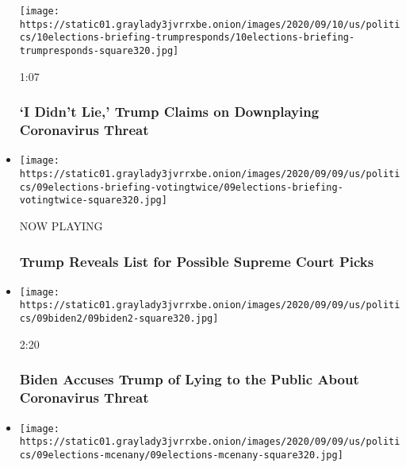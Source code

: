 \begin{itemize}
  \texttt{[image: https://static01.graylady3jvrrxbe.onion/images/2020/09/10/us/politics/10elections-briefing-trumpresponds/10elections-briefing-trumpresponds-square320.jpg]}

  1:07

  \hypertarget{i-didnt-lie-trump-claims-on-downplaying-coronavirus-threat}{%
  \subsubsection{`I Didn't Lie,' Trump Claims on Downplaying Coronavirus
  Threat}\label{i-didnt-lie-trump-claims-on-downplaying-coronavirus-threat}}
\item
  \texttt{[image: https://static01.graylady3jvrrxbe.onion/images/2020/09/09/us/politics/09elections-briefing-votingtwice/09elections-briefing-votingtwice-square320.jpg]}

  NOW PLAYING

  \hypertarget{trump-reveals-list-for-possible-supreme-court-picks-2}{%
  \subsubsection{Trump Reveals List for Possible Supreme Court
  Picks}\label{trump-reveals-list-for-possible-supreme-court-picks-2}}
\item
  \href{https://www.nytimes3xbfgragh.onion/video/us/politics/100000007331572/biden-trump-woodward-covid-michigan.html?action=click\&module=video-series-bar\&region=header\&pgtype=Article\&playlistId=video/us-politics}{}

  \texttt{[image: https://static01.graylady3jvrrxbe.onion/images/2020/09/09/us/politics/09biden2/09biden2-square320.jpg]}

  2:20

  \hypertarget{biden-accuses-trump-of-lying-to-the-public-about-coronavirus-threat}{%
  \subsubsection{Biden Accuses Trump of Lying to the Public About
  Coronavirus
  Threat}\label{biden-accuses-trump-of-lying-to-the-public-about-coronavirus-threat}}
\item
  \href{https://www.nytimes3xbfgragh.onion/video/us/politics/100000007331976/mcenany-trump-covid-virus.html?action=click\&module=video-series-bar\&region=header\&pgtype=Article\&playlistId=video/us-politics}{}

  \texttt{[image: https://static01.graylady3jvrrxbe.onion/images/2020/09/09/us/politics/09elections-mcenany/09elections-mcenany-square320.jpg]}


\end{itemize}
